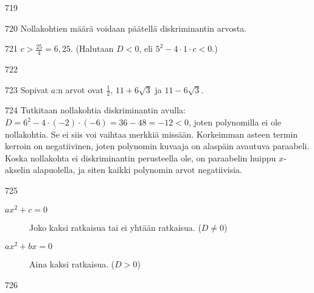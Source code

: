 \begin{Vastaus}{719}
	
\end{Vastaus}
\begin{Vastaus}{720}
	Nollakohtien määrä voidaan päätellä diskriminantin arvosta.
	
\end{Vastaus}
\begin{Vastaus}{721}
		 $c> \frac{25}{4} =6,25$. (Halutaan $D < 0$, eli $5^2-4\cdot 1 \cdot c <0$.)
	
\end{Vastaus}
\begin{Vastaus}{722}
	
\end{Vastaus}
\begin{Vastaus}{723}
		Sopivat $a$:n arvot ovat $\frac{1}{2}$, $11+6\sqrt{3}$ ja $11-6\sqrt{3}$.
	
\end{Vastaus}
\begin{Vastaus}{724}
	Tutkitaan nollakohtia diskriminantin avulla: $D=6^2-4\cdot (-2)\cdot(-6)=36-48=-12<0$, joten polynomilla ei ole nollakohtia. Se ei siis voi vaihtaa merkkiä missään. Korkeimman asteen termin kerroin on negatiivinen, joten polynomin kuvaaja on alaspäin avautuva paraabeli. Koska nollakohta ei diskriminantin perusteella ole, on paraabelin huippu $x$-akselin alapuolella, ja siten kaikki polynomin arvot negatiivisia.
	
\end{Vastaus}
\begin{Vastaus}{725}
		\begin{description}
			\item[$ax^2+c=0$] Joko kaksi ratkaisua tai ei yhtään ratkaisua. ($D \neq 0$)
			\item[$ax^2+bx=0$] Aina kaksi ratkaisua. ($D > 0$)
		\end{description}
	
\end{Vastaus}
\begin{Vastaus}{726}
	
\end{Vastaus}
